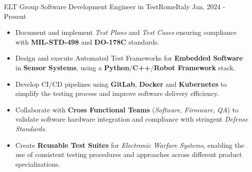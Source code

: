 
\begin{experiences}
  \experience
  {ELT Group}   {Software Development Engineer in Test}{Rome}{Italy}
  {Jan. 2024 - Present} {
    \begin{itemize}
      \item Document and implement \textit{Test Plans} and \textit{Test Cases} ensuring compliance with \textbf{MIL-STD-498} and \textbf{DO-178C} standards.
      \item Design and execute Automated Test Frameworks for \textbf{Embedded Software} in \textbf{Sensor Systems}, using a \textbf{Python}/\textbf{C++}/\textbf{Robot Framework} stack.
      \item Develop CI/CD pipelines using \textbf{GitLab}, \textbf{Docker} and \textbf{Kubernetes} to simplify the testing process and improve software delivery efficiency.
      \item Collaborate with \textbf{Cross Functional Teams} (\textit{Software}, \textit{Firmware}, \textit{QA}) to validate software hardware integration and compliance with stringent \textit{Defense Standards}.
      \item Create \textbf{Reusable Test Suites} for \textit{Electronic Warfare Systems}, enabling the use of consistent testing procedures and approaches across different product specializations.
    \end{itemize}
  }
  {}
\end{experiences}
